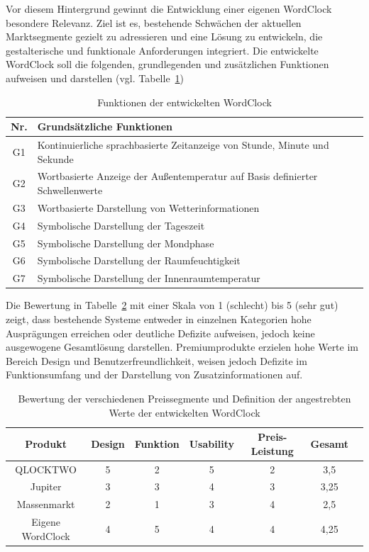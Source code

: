 Vor diesem Hintergrund gewinnt die Entwicklung einer eigenen WordClock besondere Relevanz. 
Ziel ist es, bestehende Schwächen der aktuellen Marktsegmente gezielt zu adressieren und eine Lösung zu entwickeln, die gestalterische und funktionale Anforderungen integriert. 
Die entwickelte WordClock soll die folgenden, grundlegenden und zusätzlichen Funktionen aufweisen und darstellen (vgl. Tabelle~\ref{tab:SollFunktionen})

\begin{table}[H]
\caption{Funktionen der entwickelten WordClock}
\centering
\begin{tabular}{cl}
\textbf{Nr.} & \textbf{Grundsätzliche Funktionen} \\ \hline
G1 & Kontinuierliche sprachbasierte Zeitanzeige von Stunde, Minute und Sekunde \\
G2 & Wortbasierte Anzeige der Außentemperatur auf Basis definierter Schwellenwerte \\
G3 & Wortbasierte Darstellung von Wetterinformationen \\
G4 & Symbolische Darstellung der Tageszeit \\
G5 & Symbolische Darstellung der Mondphase \\
G6 & Symbolische Darstellung der Raumfeuchtigkeit \\
G7 & Symbolische Darstellung der Innenraumtemperatur \\
\end{tabular}
\label{tab:SollFunktionen}
\end{table}

Die Bewertung in Tabelle~\ref{tab:bewertung_wordclock} mit einer Skala von 1 (schlecht) bis 5 (sehr gut) zeigt, dass bestehende Systeme entweder in einzelnen Kategorien hohe Ausprägungen erreichen oder deutliche Defizite aufweisen, jedoch keine ausgewogene Gesamtlösung darstellen. 
Premiumprodukte erzielen hohe Werte im Bereich Design und Benutzerfreundlichkeit, weisen jedoch Defizite im Funktionsumfang und der Darstellung von Zusatzinformationen auf. 

\begin{table}[h]
\caption[Bewertung der verschiedenen Preissegmente]{Bewertung der verschiedenen Preissegmente und Definition der angestrebten Werte der entwickelten WordClock}
\centering
\begin{tabular}{|c|c|c|c|c|c|c|}
\hline
\textbf{Produkt} & \textbf{Design} & \textbf{Funktion} & \textbf{Usability} & \textbf{Preis-Leistung} & \textbf{Gesamt} \\
\hline
QLOCKTWO & 5 & 2 & 5 & 2 & 3,5 \\
\hline
Jupiter & 3 & 3 & 4 & 3 & 3,25 \\
\hline
Massenmarkt & 2 & 1 & 3 & 4 & 2,5 \\
\hline
Eigene WordClock & 4 & 5 & 4 & 4 & 4,25 \\
\hline
\end{tabular}
\label{tab:bewertung_wordclock}
\end{table}

